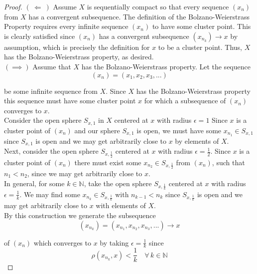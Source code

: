 \documentclass[12pt]{article}
\newlength\tindent
\renewcommand{\indent}{\hspace*{\tindent}}
\newcommand{\N}{\mathbb N}
\newcommand{\limplies}{~\Longleftarrow ~} %
\newcommand{\rimplies}{\implies} %
\begin{document}
\begin{proof} $(\limplies)$ Assume $X$ is sequentially compact so that every sequence $(x_n)$ from $X$ has a convergent subsequence. The definition of the Bolzano-Weierstrass Property requires every infinite sequence $(x_n)$ to have some cluster point. This is clearly satisfied since $(x_n)$ has a convergent subsequence $\left(x_{n_k}\right) \to x$ by assumption, which is precisely the definition for $x$ to be a cluster point. Thus, $X$ has the Bolzano-Weierstrass property, as desired. \\

$(\implies)$ Assume that $X$ has the Bolzano-Weierstrass property. Let the sequence 
\begin{equation*}
	(x_n) = \left(x_1, x_2, x_3, ...\right)
\end{equation*}

be some infinite sequence from $X$. Since $X$ has the Bolzano-Weierstrass property this sequence must have some cluster point $x$ for which a subsequence of $(x_n)$ converges to $x$. \\

\indent Consider the open sphere $S_{x,1}$ in $X$ centered at $x$ with radius $\epsilon = 1$ Since $x$ is a cluster point of $(x_n)$ and our sphere $S_{x,1}$ is open, we must have some $x_{n_1} \in S_{x,1}$ since $S_{x, 1}$ is open and we may get arbitrarily close to $x$ by elements of $X$. \\

\indent Next, consider the open sphere $S_{x,\frac{1}{2}}$ centered at $x$ with radius $\epsilon = \frac{1}{2}$. Since $x$ is a cluster point of $(x_n)$ there must exist some $x_{n_2} \in S_{x,\frac{1}{2}}$ from $(x_n)$, such that $n_1 < n_2$, since we may get arbitrarily close to $x$. \\

\indent In general, for some $k \in \N$, take the open sphere $S_{x,\frac{1}{k}}$ centered at $x$ with radius $\epsilon = \frac{1}{k}$. We may find some $x_{n_k} \in S_{x,\frac{1}{k}}$ with $n_{k - 1} < n_k$ since $S_{x,\frac{1}{k}}$ is open and we may get arbitrarily close to $x$ with elements of $X$. \\

By this construction we generate the subsequence
\begin{equation*}
	\left(x_{n_k}\right) = \left( x_{n_1}, x_{n_2}, x_{n_3}, ... \right) \longrightarrow x
\end{equation*}

of $(x_n)$ which converges to $x$ by taking $\epsilon = \frac{1}{k}$ since
\begin{equation*}
	\rho\left( x_{n_k}, x \right) < \frac{1}{k} \quad \forall\, k \in \N
\end{equation*}


\end{proof}
\end{document}
